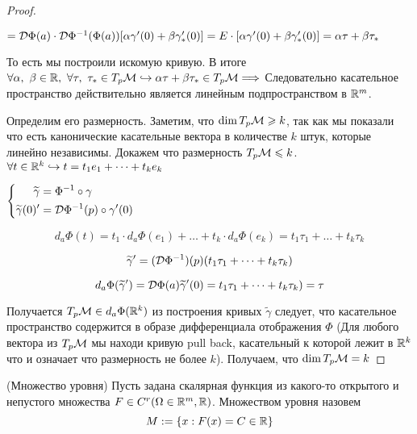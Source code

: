 \begin{proof}
\begin{flushright}
$ = \mathcal{D} \Phi (a) \cdot \mathcal{D} \Phi^{-1} (\Phi (a)) [\alpha \gamma'(0) + \beta \gamma_{*}'(0)] =  E \cdot [\alpha \gamma'(0) + \beta \gamma_{*}'(0)] = \alpha \tau + \beta \tau_{*}$
\end{flushright}
То есть мы построили искомую кривую. В итоге $\forall \alpha, \ \beta \in \R, \ \forall \tau, \ \tau_{*} \in T_{p} \M \hookrightarrow \alpha \tau + \beta \tau_{*} \in T_{p} \M \Longrightarrow$ Следовательно касательное пространство действительно является линейным подпространством в $\mathbb{R}^{m}$. 

 Определим его размерность. Заметим, что $\dim T_p \mathcal{M} \geqslant k$, так как мы показали что есть канонические касательные вектора в количестве $k$ штук, которые линейно независимы. Докажем что размерность $T_p \mathcal{M} \leqslant k$. 
$\forall t \in \mathbb{R}^k \hookrightarrow t = t_1 e_1 + \dots + t_k e_k$

$
\left\{ \begin{aligned} 
\widetilde{\gamma} &= \Phi^{-1} \circ \gamma \\
\widetilde{\gamma} (0)' &= \mathcal{D} \Phi^{-1} (p) \circ \gamma' (0)
\end{aligned} \right.
$




$$ d_a \Phi (t) = t_1 \cdot d_a \Phi (e_1) + \dots + t_k \cdot d_a \Phi (e_k) = t_1 \tau_1 + \dots + t_k \tau_k $$

$$\widetilde{\gamma}' = (\mathcal{D} \Phi ^{-1}) (p) (t_1 \tau_1 + \dots + t_k \tau_k)$$

$$d_a \Phi (\widetilde{\gamma}') = \mathcal{D} \Phi (a) \widetilde{\gamma}'(0) = t_1 \tau_1 + \dots + t_k \tau_k) = \tau$$

Получается  $T_p \mathcal{M} \in d_a \Phi (\mathbb{R}^k)$ из построения кривых $\widetilde{\gamma}$ следует, что касательное пространство содержится в образе дифференциала отображения $\Phi$ (Для любого вектора из $T_p \mathcal{M}$ мы находи кривую pull back, касательный к которой лежит в $\mathbb{R}^k$ что и означает что размерность не более $k$). Получаем, что $\dim T_p \mathcal{M} = k$

\end{proof}


\begin{definition} (Множество уровня)
Пусть задана скалярная функция из какого-то открытого и непустого множества $F \in C^r (\Omega \in \mathbb{R}^m, \mathbb{R})$. Множеством уровня назовем
$$M := \{x: F(x) = C \in \mathbb{R}\}$$
\end{definition}

